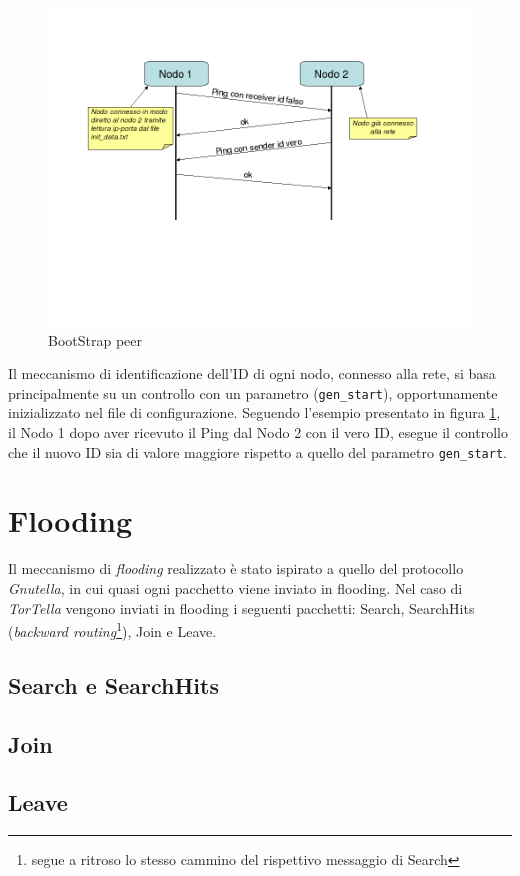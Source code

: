 \begin{figure}[H]
\begin{center}
\includegraphics[scale=0.5]{etc/Bootstrap_conn.png}
\caption{BootStrap peer}
\label{bootstrap}
\end{center}
\end{figure}
Il meccanismo di identificazione dell'ID di ogni nodo, connesso alla rete, si basa principalmente su un controllo con un parametro (\texttt{gen\_start}), opportunamente inizializzato nel file di configurazione. Seguendo l'esempio presentato in figura \ref{bootstrap}, il Nodo 1 dopo aver ricevuto il Ping dal Nodo 2 con il vero ID, esegue il controllo che il nuovo ID sia di valore maggiore rispetto a quello del parametro \texttt{gen\_start}.
\section{Flooding}
Il meccanismo di \textit{flooding} realizzato è stato ispirato a quello del protocollo \textit{Gnutella}, in cui quasi ogni pacchetto viene inviato in flooding. Nel caso di \textit{TorTella} vengono inviati in flooding i seguenti pacchetti: Search, SearchHits (\textit{backward routing}\footnote{segue a ritroso lo stesso cammino del rispettivo messaggio di Search}), Join e Leave.
\subsection{Search e SearchHits}

\subsection{Join}

\subsection{Leave}